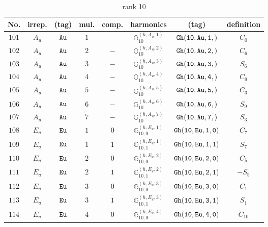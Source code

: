 \documentclass[fleqn,8pt]{jsarticle}
\begin{document}
\begin{table}[ht!]
\begin{center}
\caption{rank 10}
\renewcommand{\arraystretch}{1.3}
\begin{tabular}{cccccccc} \hline \hline
No. & irrep. & (tag) & mul. & comp. & harmonics & (tag) & definition \\ \hline
$ 101 $ & $ A_{u} $ & $ {\tt Au} $ & $ 1 $ & $ - $ & $ \mathbb{G}_{10}^{(h,A_{u},1)} $ & $ {\tt Gh(10,Au,1,)} $ & $ C_{0} $ \\
$ 102 $ & $ A_{u} $ & $ {\tt Au} $ & $ 2 $ & $ - $ & $ \mathbb{G}_{10}^{(h,A_{u},2)} $ & $ {\tt Gh(10,Au,2,)} $ & $ C_{6} $ \\
$ 103 $ & $ A_{u} $ & $ {\tt Au} $ & $ 3 $ & $ - $ & $ \mathbb{G}_{10}^{(h,A_{u},3)} $ & $ {\tt Gh(10,Au,3,)} $ & $ S_{6} $ \\
$ 104 $ & $ A_{u} $ & $ {\tt Au} $ & $ 4 $ & $ - $ & $ \mathbb{G}_{10}^{(h,A_{u},4)} $ & $ {\tt Gh(10,Au,4,)} $ & $ C_{9} $ \\
$ 105 $ & $ A_{u} $ & $ {\tt Au} $ & $ 5 $ & $ - $ & $ \mathbb{G}_{10}^{(h,A_{u},5)} $ & $ {\tt Gh(10,Au,5,)} $ & $ C_{3} $ \\
$ 106 $ & $ A_{u} $ & $ {\tt Au} $ & $ 6 $ & $ - $ & $ \mathbb{G}_{10}^{(h,A_{u},6)} $ & $ {\tt Gh(10,Au,6,)} $ & $ S_{9} $ \\
$ 107 $ & $ A_{u} $ & $ {\tt Au} $ & $ 7 $ & $ - $ & $ \mathbb{G}_{10}^{(h,A_{u},7)} $ & $ {\tt Gh(10,Au,7,)} $ & $ S_{3} $ \\
$ 108 $ & $ E_{u} $ & $ {\tt Eu} $ & $ 1 $ & $ 0 $ & $ \mathbb{G}_{10,0}^{(h,E_{u},1)} $ & $ {\tt Gh(10,Eu,1,0)} $ & $ C_{7} $ \\
$ 109 $ & $ E_{u} $ & $ {\tt Eu} $ & $ 1 $ & $ 1 $ & $ \mathbb{G}_{10,1}^{(h,E_{u},1)} $ & $ {\tt Gh(10,Eu,1,1)} $ & $ S_{7} $ \\
$ 110 $ & $ E_{u} $ & $ {\tt Eu} $ & $ 2 $ & $ 0 $ & $ \mathbb{G}_{10,0}^{(h,E_{u},2)} $ & $ {\tt Gh(10,Eu,2,0)} $ & $ C_{5} $ \\
$ 111 $ & $ E_{u} $ & $ {\tt Eu} $ & $ 2 $ & $ 1 $ & $ \mathbb{G}_{10,1}^{(h,E_{u},2)} $ & $ {\tt Gh(10,Eu,2,1)} $ & $ - S_{5} $ \\
$ 112 $ & $ E_{u} $ & $ {\tt Eu} $ & $ 3 $ & $ 0 $ & $ \mathbb{G}_{10,0}^{(h,E_{u},3)} $ & $ {\tt Gh(10,Eu,3,0)} $ & $ C_{1} $ \\
$ 113 $ & $ E_{u} $ & $ {\tt Eu} $ & $ 3 $ & $ 1 $ & $ \mathbb{G}_{10,1}^{(h,E_{u},3)} $ & $ {\tt Gh(10,Eu,3,1)} $ & $ S_{1} $ \\
$ 114 $ & $ E_{u} $ & $ {\tt Eu} $ & $ 4 $ & $ 0 $ & $ \mathbb{G}_{10,0}^{(h,E_{u},4)} $ & $ {\tt Gh(10,Eu,4,0)} $ & $ C_{10} $ \\

\end{tabular}
\end{center}
\end{table}
\end{document}
